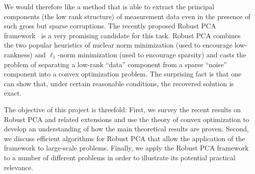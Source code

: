 We would therefore like a method that is able to extract the principal components (the low rank structure) of measurement data even in the presence of such gross but sparse corruptions. The recently proposed Robust PCA framework~\cite{Candes:2011fk} is a very promising candidate for this task. Robust PCA combines the two popular heuristics of nuclear norm minimization (used to encourage low-rankness) and $\ell_1$-norm minimization (used to encourage sparsity) and casts the problem of separating a low-rank ``data'' component from a sparse ``noise'' component into a convex optimization problem. The surprising fact is that one can show that, under certain reasonable conditions, the recovered solution is exact. 

The objective of this project is threefold: First, we survey the recent results on Robust PCA and related extensions and use the theory of convex optimization to develop an understanding of how the main theoretical results are proven. Second, we discuss efficient algorithms for Robust PCA that allow the application of the framework to large-scale problems. Finally, we apply the Robust PCA framework to a number of different problems in order to illustrate its potential practical relevance. 

